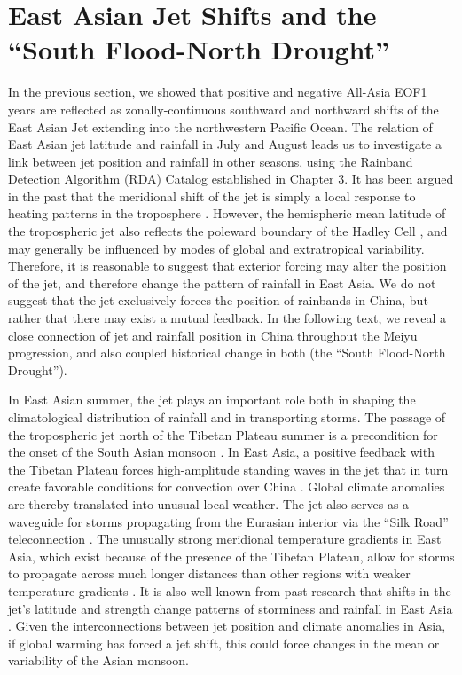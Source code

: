 \section{East Asian Jet Shifts and the ``South Flood-North Drought''}

	In the previous section, we showed that positive and negative All-Asia EOF1 years are reflected as zonally-continuous southward and northward shifts of the East Asian Jet extending into the northwestern Pacific Ocean. The relation of East Asian jet latitude and rainfall in July and August leads us to investigate a link between jet position and rainfall in other seasons, using the Rainband Detection Algorithm (RDA) Catalog established in Chapter 3. It has been argued in the past that the meridional shift of the jet is simply a local response to heating patterns in the troposphere \citep{Yu and Zhou}. However, the hemispheric mean latitude of the tropospheric jet also reflects the poleward boundary of the Hadley Cell \citep{Kang2015}, and may generally be influenced by modes of global and extratropical variability. Therefore, it is reasonable to suggest that exterior forcing may alter the position of the jet, and therefore change the pattern of rainfall in East Asia. We do not suggest that the jet exclusively forces the position of rainbands in China, but rather that there may exist a mutual feedback. In the following text, we reveal a close connection of jet and rainfall position in China throughout the Meiyu progression, and also coupled historical change in both (the ``South Flood-North Drought'').

	In East Asian summer, the jet plays an important role both in shaping the climatological distribution of rainfall and in transporting storms. The passage of the tropospheric jet north of the Tibetan Plateau summer is a precondition for the onset of the South Asian monsoon \citep{Yin1949,Yeh1959,Hahn1975}. In East Asia, a positive feedback with the Tibetan Plateau forces high-amplitude standing waves in the jet that in turn create favorable conditions for convection over China \citep{Yang2002,Molnar2010,Chen2015}. Global climate anomalies are thereby translated into unusual local weather\citep{Nigam1989,Broccoli1992,Park1997}. The jet also serves as a waveguide for storms propagating from the Eurasian interior via the ``Silk Road'' teleconnection \citep{Hoskins1993,Ambrizzi1997,Kosaka2012}. The unusually strong meridional temperature gradients in East Asia, which exist because of the presence of the Tibetan Plateau, allow for storms to propagate across much longer distances than other regions with weaker temperature gradients \citep{Branstator2002}. It is also well-known from past research that shifts in the jet's latitude and strength change patterns of storminess and rainfall in East Asia \citep{Liang1998,Branstator2002,Kwon2007,Du2009,Li2014}.  Given the interconnections between jet position and climate anomalies in Asia, if global warming has forced a jet shift, this could force changes in the mean or variability of the Asian monsoon.
		 
